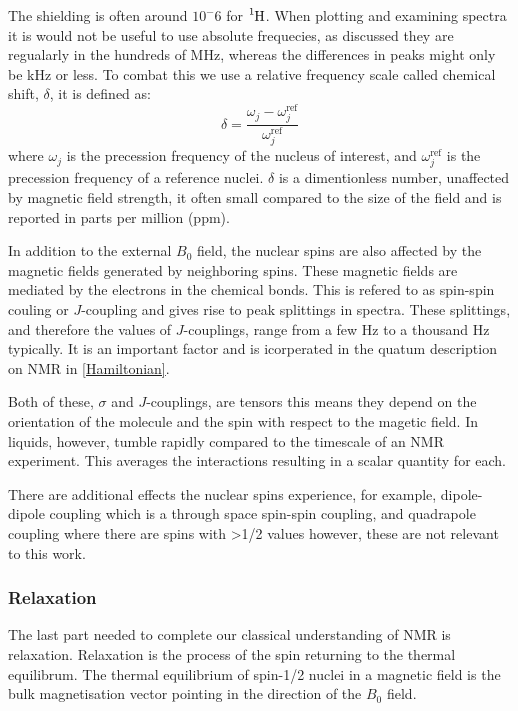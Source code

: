 The shielding is often around $10^-6$ for $\ce{^1H}$. When plotting and examining spectra
it is would not be useful to use absolute frequecies, as discussed they are regualarly in the hundreds of MHz,
whereas the differences in peaks might only be kHz or less. To combat this we use a relative frequency scale
called chemical shift, $\delta$, it is defined as:
\begin{equation}
  \delta = \frac{\omega_j-\omega^\text{ref}_j}{\omega^\text{ref}_j}
\end{equation}
where $\omega_j$ is the precession frequency of the nucleus of interest, and $\omega^\text{ref}_j$ is the precession
frequency of a reference nuclei. $\delta$ is a dimentionless number, unaffected by magnetic field strength, it often
small compared to the size of the field and is reported in parts per million (ppm).

In addition to the external $B_0$ field, the nuclear spins are also affected by the magnetic fields generated
by neighboring spins. These magnetic fields are mediated by the electrons in the chemical bonds. This is refered to as
spin-spin couling or $J$-coupling and gives rise to peak splittings in spectra. These splittings, and therefore the values of $J$-couplings, range from a few Hz to a thousand Hz typically. It is an important factor and is icorperated
in the quatum description on NMR in \ref{Hamiltonian}.

Both of these, $\sigma$ and $J$-couplings, are tensors this means they depend on the orientation of the molecule
and the spin with respect to the magetic field. In liquids, however, tumble rapidly compared to the timescale
of an NMR experiment. This averages the interactions resulting in a scalar quantity for each.

There are additional effects the nuclear spins experience, for example, dipole-dipole coupling which
is a through space spin-spin coupling, and quadrapole coupling where there are spins with >1/2 values
however, these are not relevant to this work.

\subsubsection{Relaxation}\label{Relaxation}

The last part needed to complete our classical understanding of NMR is relaxation. Relaxation is the process
of the spin returning to the thermal equilibrum. The thermal equilibrium of spin-1/2 nuclei in a
magnetic field is the bulk magnetisation vector pointing in the direction of the $B_0$ field.

